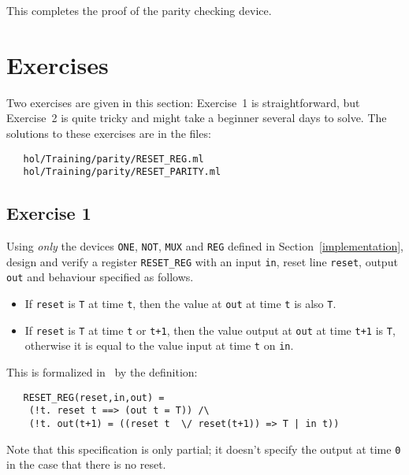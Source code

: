 \noindent This completes the proof of the
parity checking device.

\section{Exercises}
\label{exercises}

Two exercises are given in this section:
Exercise~1 is straightforward, but Exercise~2 is quite tricky and
might take a beginner several days to solve. The solutions to these exercises are
in the files:

\begin{hol}\begin{verbatim}
   hol/Training/parity/RESET_REG.ml
   hol/Training/parity/RESET_PARITY.ml
\end{verbatim}\end{hol}


\subsection{Exercise 1}

Using {\it only\/} the devices {\small\verb|ONE|}, {\small\verb|NOT|},
{\small\verb|MUX|} and {\small\verb|REG|} defined in Section~\ref{implementation},
design and verify a register {\small\verb|RESET_REG|}
with an input {\small\verb|in|}, reset line {\small\verb|reset|},
output {\small\verb|out|} and behaviour specified as follows.
\begin{itemize}
\item If {\small\verb|reset|} is {\small\verb|T|} at time {\small\verb|t|},
then the value at {\small\verb|out|} at time {\small\verb|t|} is also
{\small\verb|T|}.
\item If {\small\verb|reset|} is {\small\verb|T|} at time {\small\verb|t|} or
{\small\verb|t+1|},
then the value output at {\small\verb|out|} at time {\small\verb|t+1|} is
{\small\verb|T|}, otherwise it is equal to
the value input at time {\small\verb|t|} on {\small\verb|in|}.
\end{itemize}
This is formalized in \HOL\ by the definition:

{\small\baselineskip\HOLSpacing\begin{verbatim}
   RESET_REG(reset,in,out) =
    (!t. reset t ==> (out t = T)) /\
    (!t. out(t+1) = ((reset t  \/ reset(t+1)) => T | in t))
\end{verbatim}}

\noindent Note that this specification is only partial; it doesn't specify the
output at time {\small\verb|0|} in the case that there is no reset.

